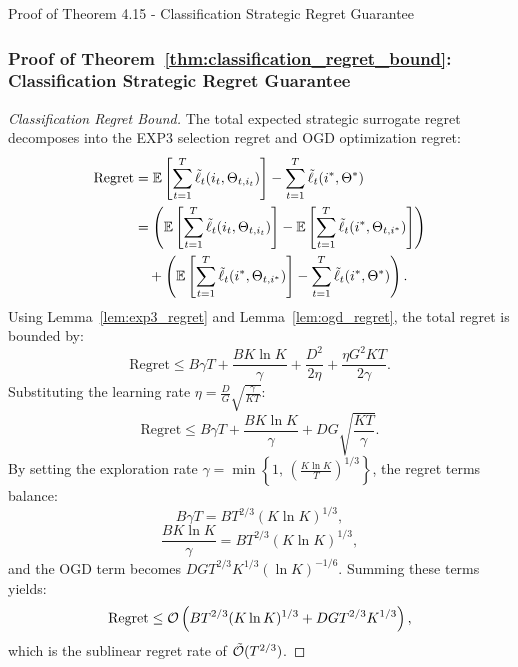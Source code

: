 \begin{sourceblock}{Proof of Theorem 4.15 - Classification Strategic Regret Guarantee}
\subsubsection*{Proof of Theorem~\ref{thm:classification_regret_bound}: Classification Strategic Regret Guarantee}
\label{app:proof_classification_regret_bound}
\begin{proof}[Classification Regret Bound]
The total expected strategic surrogate regret decomposes into the EXP3 selection regret and OGD optimization regret:
\begin{align}
    \text{Regret} &= \mathbb{E}\left[ \sum_{t=1}^T \tilde{\ell}_t(i_t, \Theta_{t, i_t}) \right] - \sum_{t=1}^T \tilde{\ell}_t(i^*, \Theta^*) \nonumber \\
    &= \left( \mathbb{E}\left[ \sum_{t=1}^T \tilde{\ell}_t(i_t, \Theta_{t, i_t}) \right] - \mathbb{E}\left[ \sum_{t=1}^T \tilde{\ell}_t(i^*, \Theta_{t, i^*}) \right] \right) \nonumber \\
    &\quad + \left( \mathbb{E}\left[ \sum_{t=1}^T \tilde{\ell}_t(i^*, \Theta_{t, i^*}) \right] - \sum_{t=1}^T \tilde{\ell}_t(i^*, \Theta^*) \right).
\end{align}
Using Lemma~\ref{lem:exp3_regret} and Lemma~\ref{lem:ogd_regret}, the total regret is bounded by:
\begin{equation}
    \text{Regret} \le B \gamma T + \frac{B K \ln K}{\gamma} + \frac{D^2}{2\eta} + \frac{\eta G^2 K T}{2 \gamma}.
\end{equation}
Substituting the learning rate $\eta = \frac{D}{G}\sqrt{\frac{\gamma}{K T}}$:
\begin{equation}
    \text{Regret} \le B \gamma T + \frac{B K \ln K}{\gamma} + D G \sqrt{\frac{K T}{\gamma}}.
\end{equation}
By setting the exploration rate $\gamma = \min\left\{ 1, \, \left( \frac{K \ln K}{T} \right)^{1/3} \right\}$, the regret terms balance:
\begin{equation}
    B \gamma T = B T^{2/3}(K \ln K)^{1/3},
\end{equation}
\begin{equation}
    \frac{B K \ln K}{\gamma} = B T^{2/3}(K \ln K)^{1/3},
\end{equation}
and the OGD term becomes $D G T^{2/3} K^{1/3} (\ln K)^{-1/6}$. Summing these terms yields:
\begin{equation}
    \text{Regret} \le \mathcal{O}\left( B T^{2/3} (K \ln K)^{1/3} + D G T^{2/3} K^{1/3} \right),
\end{equation}
which is the sublinear regret rate of $\tilde{\mathcal{O}}(T^{2/3})$.
\end{proof}
\end{sourceblock}

